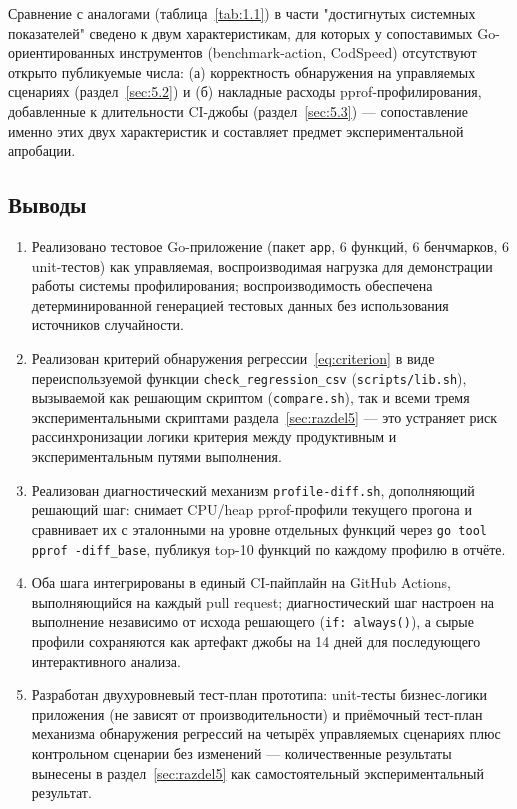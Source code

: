 Сравнение с аналогами (таблица~\ref{tab:1.1}) в части "достигнутых
системных показателей" сведено к двум характеристикам, для которых
у сопоставимых Go-ориентированных инструментов (benchmark-action,
CodSpeed) отсутствуют открыто публикуемые числа: (а) корректность
обнаружения на управляемых сценариях (раздел~\ref{sec:5.2}) и
(б) накладные расходы pprof-профилирования, добавленные к длительности
CI-джобы (раздел~\ref{sec:5.3}) — сопоставление именно этих двух
характеристик и составляет предмет экспериментальной апробации.

\subsection{Выводы}

\begin{enumerate}
\item Реализовано тестовое Go-приложение (пакет \texttt{app}, 6 функций,
6 бенчмарков, 6 unit-тестов) как управляемая, воспроизводимая нагрузка для
демонстрации работы системы профилирования; воспроизводимость обеспечена
детерминированной генерацией тестовых данных без использования
источников случайности.
\item Реализован критерий обнаружения регрессии~\eqref{eq:criterion} в виде
переиспользуемой функции \texttt{check\_regression\_csv}
(\texttt{scripts/\allowbreak lib.sh}), вызываемой как решающим скриптом
(\texttt{compare.sh}), так и всеми тремя экспериментальными скриптами
раздела~\ref{sec:razdel5} — это устраняет риск рассинхронизации логики
критерия между продуктивным и экспериментальным путями выполнения.
\item Реализован диагностический механизм \texttt{profile-diff.sh},
дополняющий решающий шаг: снимает CPU/heap pprof-профили текущего прогона
и сравнивает их с эталонными на уровне отдельных функций через
\texttt{go tool pprof -diff\_base}, публикуя top-10 функций по каждому
профилю в отчёте.
\item Оба шага интегрированы в единый CI-пайплайн на GitHub Actions,
выполняющийся на каждый pull request; диагностический шаг настроен на
выполнение независимо от исхода решающего (\texttt{if: always()}), а сырые
профили сохраняются как артефакт джобы на 14 дней для последующего
интерактивного анализа.
\item Разработан двухуровневый тест-план прототипа: unit-тесты бизнес-логики
приложения (не зависят от производительности) и приёмочный тест-план
механизма обнаружения регрессий на четырёх управляемых сценариях плюс
контрольном сценарии без изменений — количественные результаты вынесены
в раздел~\ref{sec:razdel5} как самостоятельный экспериментальный результат.
\end{enumerate}
